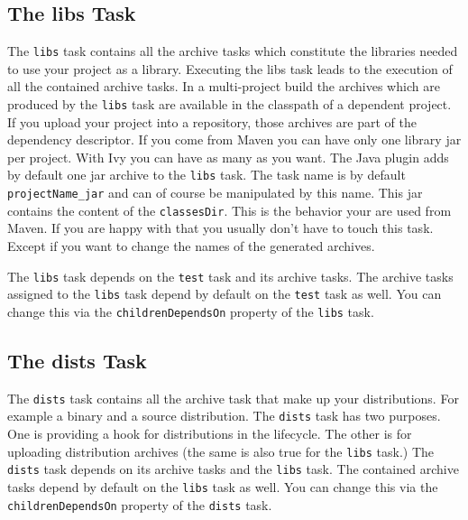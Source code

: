 \subsection{The libs Task} %
\label{sub:the_libs_task}
The \texttt{libs} task contains all the archive tasks which constitute the libraries needed to use your project as a library. Executing the libs task leads to the execution of all the contained archive tasks. In a multi-project build the archives which are produced by the \texttt{libs} task are available in the classpath of a dependent project. If you upload your project into a repository, those archives are part of the dependency descriptor. If you come from Maven you can have only one library jar per project. With Ivy you can have as many as you want. 
The Java plugin adds by default one jar archive to the \texttt{libs} task. The task name is by default \texttt{projectName\_jar} and can of course be manipulated by this name. This jar contains the content of the \texttt{classesDir}. This is the behavior your are used from Maven. If you are happy with that you usually don't have to touch this task. Except if you want to change the names of the generated archives. 

The \texttt{libs} task depends on the \texttt{test} task and its archive tasks. The archive tasks assigned to the \texttt{libs} task depend by default on the \texttt{test} task as well. You can change this via the \texttt{childrenDependsOn} property of the \texttt{libs} task. 
\subsection{The dists Task} %
\label{sub:the_dists_task}
The \texttt{dists} task contains all the archive task that make up your distributions. For example a binary and a source distribution. The \texttt{dists} task has two purposes. One is providing a hook for distributions in the lifecycle. The other is for uploading distribution archives (the same is also true for the \texttt{libs} task.) The \texttt{dists} task depends on its archive tasks and the \texttt{libs} task. The contained archive tasks depend by default on the \texttt{libs} task as well. You can change this via the \texttt{childrenDependsOn} property of the \texttt{dists} task. 
